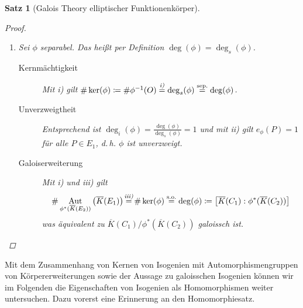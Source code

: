\documentclass[english, german, parskip=half]{scrartcl}
\newtheorem{Satz}{Satz}[section]
\theoremstyle{definition}
\theoremstyle{remark}
\newcommand*{\algK}{\ensuremath{\overline K}} %
\newcommand*{\degs}{\operatorname{\deg}_s} %
\newcommand*{\degi}{\operatorname{\deg}_i} %
\DeclareMathOperator{\Aut}{Aut} %
\begin{document}
\begin{Satz}[Galois Theory elliptischer Funktionenkörper]
\begin{proof}
\begin{enumerate}[label=\roman*)]
\begin{description}
          die stark von den Koordinaten von $T$ und $O$ abhängen,
          geht hervor, dass dann bereits die Koordinaten von
          $T$ und $O$ übereinstimmen müssen. Damit muss $T=O$ sein.
        \end{description}
    \item Sei $\phi$ separabel. Das heißt per Definition
      $\deg(\phi)=\degs(\phi)$.
      \begin{description}
        \item[Kernmächtigkeit]
          Mit \emph{i)} gilt
          $
          \#\ker(\phi)
          \coloneqq \#\phi^{-1}(O)
          \overset{\mathclap{\emph{i)}}}{=} \degs(\phi)
          \overset{{\text{sep.}}}{=} \deg(\phi)
          $.
        \item[Unverzweigtheit] 
          Entsprechend ist
          $\degi(\phi)=\frac{\deg(\phi)}{\degs(\phi)}=1$
          und mit \emph{ii)} gilt
          $e_\phi(P)=1$ für alle $P\in E_1$, d.\,h. $\phi$
          ist unverzweigt.
        \item[Galoiserweiterung]
          Mit \emph{i)} und \emph{iii)} gilt
          \begin{align*}
            \#\Aut_{\phi^*(\algK(E_2))}\left( \algK(E_1) \right) 
            \overset{\mathclap{\text{\emph{iii)}}}}{=}
              \#\ker(\phi)
            \overset{{\text{s.o.}}}{=} \deg(\phi)
            \coloneqq \left[\algK(C_1):\phi^*(\algK(C_2))\right]
          \end{align*}
          was äquivalent zu
          $\algK(C_1)/\phi^*(\algK(C_2))$ galoissch ist.
        \end{description}
      \end{enumerate}
\end{proof}
\end{Satz}

Mit dem Zusammenhang von Kernen von Isogenien mit
Automorphismengruppen von Körpererweiterungen sowie der Aussage zu
galoisschen Isogenien können wir im Folgenden die Eigenschaften von
Isogenien als Homomorphismen weiter untersuchen.
Dazu vorerst eine Erinnerung an den Homomorphiesatz.
\end{document}
